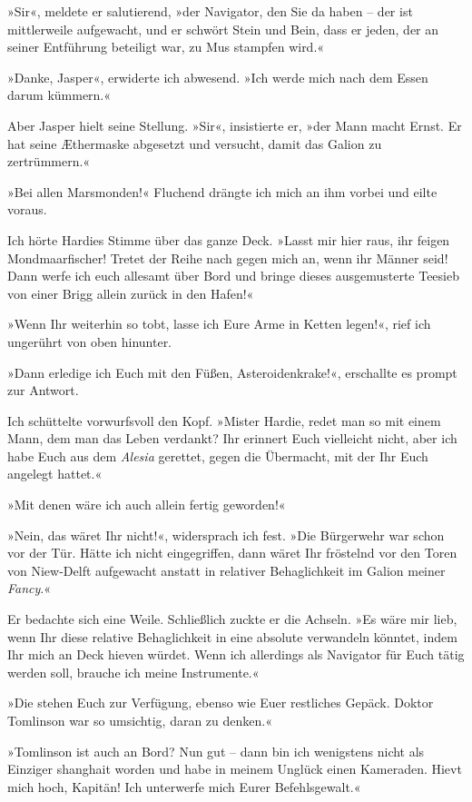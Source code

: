 »Sir«, meldete er salutierend, »der Navigator, den Sie da haben –
der ist mittlerweile aufgewacht, und er schwört Stein und Bein,
dass er jeden, der an seiner Entführung beteiligt war, zu Mus
stampfen wird.«

»Danke, Jasper«, erwiderte ich abwesend. »Ich werde mich nach dem
Essen darum kümmern.«

Aber Jasper hielt seine Stellung. »Sir«, insistierte er, »der Mann
macht Ernst. Er hat seine Æthermaske abgesetzt und versucht, damit
das Galion zu zertrümmern.«

»Bei allen Marsmonden!« Fluchend drängte ich mich an ihm vorbei und
eilte voraus.

Ich hörte Hardies Stimme über das ganze Deck. »Lasst mir hier raus,
ihr feigen Mondmaarfischer! Tretet der Reihe nach gegen mich an,
wenn ihr Männer seid! Dann werfe ich euch allesamt über Bord und
bringe dieses ausgemusterte Teesieb von einer Brigg allein zurück
in den Hafen!«

»Wenn Ihr weiterhin so tobt, lasse ich Eure Arme in Ketten legen!«,
rief ich ungerührt von oben hinunter.

»Dann erledige ich Euch mit den Füßen, Asteroidenkrake!«,
erschallte es prompt zur Antwort.

Ich schüttelte vorwurfsvoll den Kopf. »Mister Hardie, redet man so
mit einem Mann, dem man das Leben verdankt? Ihr erinnert Euch
vielleicht nicht, aber ich habe Euch aus dem \emph{Alesia}
gerettet, gegen die Übermacht, mit der Ihr Euch angelegt hattet.«

»Mit denen wäre ich auch allein fertig geworden!«

»Nein, das wäret Ihr nicht!«, widersprach ich fest. »Die Bürgerwehr
war schon vor der Tür. Hätte ich nicht eingegriffen, dann wäret Ihr
fröstelnd vor den Toren von Niew-Delft aufgewacht anstatt in
relativer Behaglichkeit im Galion meiner \emph{Fancy}.«

Er bedachte sich eine Weile. Schließlich zuckte er die Achseln. »Es
wäre mir lieb, wenn Ihr diese relative Behaglichkeit in eine
absolute verwandeln könntet, indem Ihr mich an Deck hieven würdet.
Wenn ich allerdings als Navigator für Euch tätig werden soll,
brauche ich meine Instrumente.«

»Die stehen Euch zur Verfügung, ebenso wie Euer restliches Gepäck.
Doktor Tomlinson war so umsichtig, daran zu denken.«

»Tomlinson ist auch an Bord? Nun gut – dann bin ich wenigstens
nicht als Einziger shanghait worden und habe in meinem Unglück
einen Kameraden. Hievt mich hoch, Kapitän! Ich unterwerfe mich
Eurer Befehlsgewalt.«

